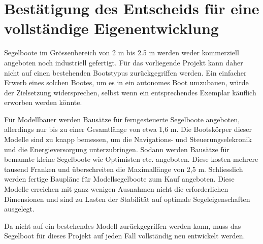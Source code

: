 \section{Bestätigung des Entscheids für eine vollständige Eigenentwicklung}
Segelboote im Grössenbereich von 2 m bis 2.5 m werden weder kommerziell angeboten noch industriell gefertigt. Für das vorliegende Projekt kann daher nicht auf einen bestehenden Bootstypus zurückgegriffen werden. Ein einfacher Erwerb eines solchen Bootes, um es in ein autonomes Boot umzubauen, würde der Zielsetzung widersprechen, selbst wenn ein entsprechendes Exemplar käuflich erworben werden könnte.

Für Modellbauer werden Bausätze für ferngesteuerte Segelboote angeboten, allerdings nur bis zu einer Gesamtlänge von etwa 1,6 m. Die Bootskörper dieser Modelle sind zu knapp bemessen, um die Navigations- und Steuerungselekronik und die Energieversorgung unterzubringen. Sodann werden Bausätze für bemannte kleine Segelboote wie Optimisten etc. angeboten. Diese kosten mehrere tausend Franken und überschreiten die Maximallänge von 2,5 m. Schliesslich werden fertige Baupläne für Modellsegelboote zum Kauf angeboten. Diese Modelle erreichen mit ganz wenigen Ausnahmen nicht die erforderlichen Dimensionen und sind zu Lasten der Stabilität auf optimale Segeleigenschaften ausgelegt. 

Da nicht auf ein bestehendes Modell zurückgegriffen werden kann, muss das Segelboot für dieses Projekt auf jeden Fall vollständig neu entwickelt werden. 



